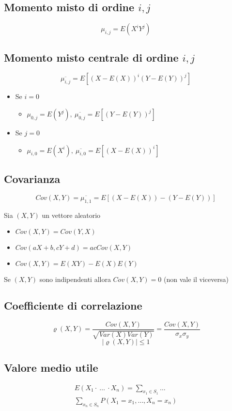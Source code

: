 \begin{multicols*}{2}
\subsection*{Momento misto di ordine $i,j$}
$$
\mu_{i,j} = E(X^i Y^j)
$$

\subsection*{Momento misto centrale di ordine $i,j$}
$$
\overline{\mu_{i,j}} = E[(X- E(X))^i (Y - E(Y))^j]
$$
\begin{itemize}
    \item Se $i = 0$
    \begin{itemize}
        \item $\mu_{0,j} = E(Y^j), \ \overline{\mu_{0,j}} = E[(Y - E(Y))^j]$
    \end{itemize}
    \item Se $j = 0$
    \begin{itemize}
        \item $\mu_{i,0} = E(X^i), \ \overline{\mu_{i,0}} = E[(X - E(X))^i]$
    \end{itemize}
\end{itemize}

\subsection*{Covarianza}
$$
\mathit{Cov}(X,Y) = \overline{\mu_{1,1}} = E[(X - E(X)) - (Y - E(Y))]
$$
 
Sia $(X,Y)$ un vettore aleatorio
\begin{itemize}
    \item $\mathit{Cov}(X,Y) = \mathit{Cov}(Y,X)$
    \item $\mathit{Cov}(aX + b, cY + d) = ac \mathit{Cov}(X,Y)$
    \item $\mathit{Cov}(X,Y) = E(XY) - E(X)E(Y)$
\end{itemize}

Se $(X,Y)$ sono indipendenti allora $\mathit{Cov}(X,Y) = 0$ (non vale il viceversa)

\subsection*{Coefficiente di correlazione}
$$
\varrho(X,Y) = \frac{\mathit{Cov}(X,Y)}{\sqrt{\mathit{Var}(X) \mathit{Var}(Y)}}
= \frac{\mathit{Cov}(X,Y)}{\sigma_x \sigma_y}
$$
$$
|\varrho(X,Y)| \le 1
$$

\subsection*{Valore medio utile}
\begin{align*}
E(X_1 \cdot \ \dots \ \cdot X_n) = \sum_{x_1 \in S_1} \dots 
\\\sum_{x_n \in S_n}
P(X_1=x_1, \dots, X_n=x_n)
\end{align*}

\end{multicols*}